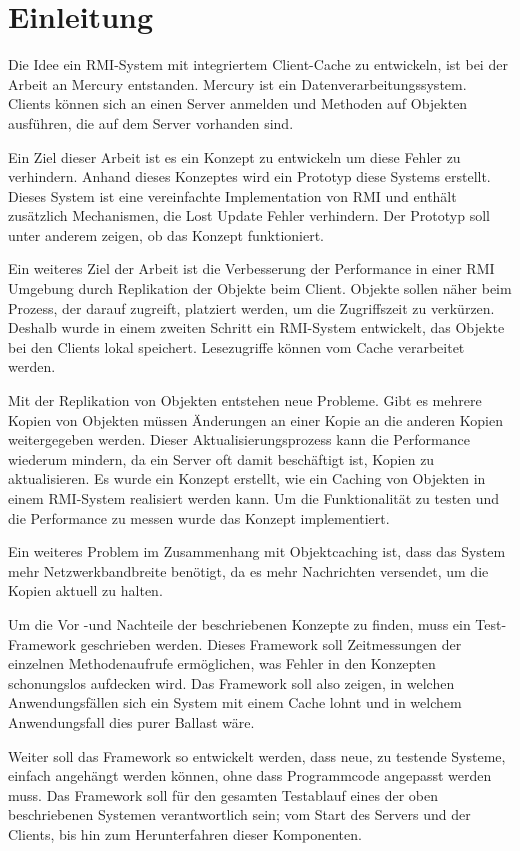 \chapter{Einleitung}

Die Idee ein RMI-System mit integriertem Client-Cache zu entwickeln, ist bei der Arbeit an Mercury entstanden. Mercury ist ein Datenverarbeitungssystem. Clients können sich an einen Server anmelden und Methoden auf Objekten ausführen, die auf dem Server vorhanden sind. 

Ein Ziel dieser Arbeit ist es ein Konzept zu entwickeln um
diese Fehler zu verhindern. Anhand dieses Konzeptes wird ein Prototyp
diese Systems erstellt. Dieses System ist eine vereinfachte
Implementation von RMI und enthält zusätzlich Mechanismen, die Lost
Update Fehler verhindern. Der Prototyp soll unter anderem zeigen, ob
das Konzept funktioniert. 

Ein weiteres Ziel der Arbeit ist die Verbesserung der Performance in einer RMI Umgebung durch Replikation der Objekte beim Client. Objekte sollen näher beim Prozess, der darauf zugreift, platziert werden, um die Zugriffszeit zu verkürzen. Deshalb wurde in einem zweiten Schritt ein RMI-System entwickelt, das Objekte bei den Clients lokal speichert. Lesezugriffe können vom Cache verarbeitet werden.

Mit der Replikation von Objekten entstehen neue Probleme. Gibt es mehrere Kopien von Objekten müssen Änderungen an einer Kopie an die anderen Kopien weitergegeben werden. Dieser Aktualisierungsprozess kann die Performance wiederum mindern, da ein Server oft damit beschäftigt ist, Kopien zu aktualisieren. Es wurde ein Konzept erstellt, wie ein Caching von Objekten in einem RMI-System realisiert werden kann. Um die Funktionalität zu testen und die Performance zu messen wurde das Konzept implementiert. 

Ein weiteres Problem im Zusammenhang mit Objektcaching ist, dass das System mehr Netzwerkbandbreite benötigt, da es mehr Nachrichten versendet, um die Kopien aktuell zu halten.

Um die Vor -und Nachteile der beschriebenen Konzepte zu finden, muss ein Test-Framework geschrieben werden. Dieses Framework soll Zeitmessungen der einzelnen Methodenaufrufe ermöglichen, was Fehler in den Konzepten schonungslos aufdecken wird. Das Framework soll also zeigen, in welchen Anwendungsfällen sich ein System mit einem Cache lohnt und in welchem Anwendungsfall dies purer Ballast wäre.

Weiter soll das Framework so entwickelt werden, dass neue, zu testende Systeme, einfach angehängt werden können, ohne dass Programmcode angepasst werden muss. Das Framework soll für den gesamten Testablauf eines der oben beschriebenen Systemen verantwortlich sein; vom Start des Servers und der Clients, bis hin zum Herunterfahren dieser Komponenten.

